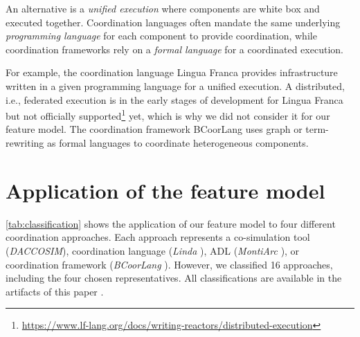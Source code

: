 \documentclass[runningheads]{llncs}
\begin{document}
An alternative is a \textit{unified execution} where components are white box and executed together.
Coordination languages often mandate the same underlying \textit{programming language} for each component to provide coordination, while coordination frameworks rely on a \textit{formal language} for a coordinated execution.

For example, the coordination language Lingua Franca \cite{lohstrohReactorsDeterministicModel2020} provides infrastructure written in a given programming language for a unified execution.
A distributed, i.e., federated execution is in the early stages of development for Lingua Franca but not officially supported\footnote{\url{https://www.lf-lang.org/docs/writing-reactors/distributed-execution}} yet, which is why we did not consider it for our feature model.
The coordination framework BCoorLang \cite{krauterBehavioralConsistencyMultimodeling2023} uses graph or term-rewriting as formal languages to coordinate heterogeneous components.


\section{Application of the feature model} \label{sec:application}
\autoref{tab:classification} shows the application of our feature model to four different coordination approaches.
Each approach represents a co-simulation tool (\textit{DACCOSIM}), coordination language (\textit{Linda} \cite{carrieroLindaContext1989,carrieroLindaAlternativeMessagepassing1994}), ADL (\textit{MontiArc} \cite{haberMontiArcArchitecturalModeling2014}), or coordination framework (\textit{BCoorLang} \cite{krauterBehavioralConsistencyHeterogeneous2021,krauterBehavioralConsistencyMultimodeling2023}).
However, we classified 16 approaches, including the four chosen representatives.
All classifications are available in the artifacts of this paper \cite{timkrauterArtifactsCoordination2024}.
\end{document}
